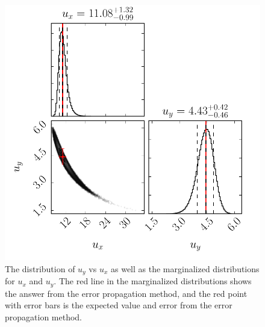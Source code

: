 \documentclass[12pt,a4paper]{article}
\begin{document}
\begin{enumerate}[a)]
 \begin{figure}[ht]
  \centering
  \includegraphics[keepaspectratio]{hw2_b_corner.pdf}
  \caption{The distribution of $u_y$ vs $u_x$ as well as the marginalized distributions for $u_x$ and $u_y$. The red line in the marginalized distributions shows the answer from the error propagation method, and the red point with error bars is the expected value and error from the error propagation method.}
  \label{fig:corner}
 \end{figure}
\end{enumerate}
\end{document}
